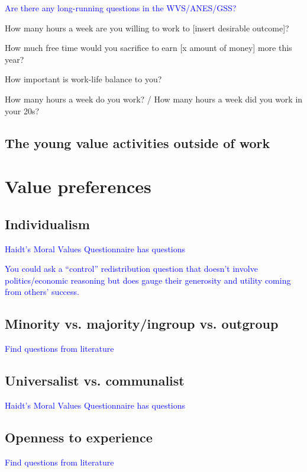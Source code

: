 \documentclass[12pt]{article}
\newcommand{\blue}[1]{\textcolor{blue}{#1}}
\begin{document}
    \blue{Are there any long-running questions in the WVS/ANES/GSS?}

    How many hours a week are you willing to work to [insert desirable outcome]?

    How much free time would you sacrifice to earn [x amount of money] more this year?

    How important is work-life balance to you? 

    How many hours a week do you work? / How many hours a week did you work in your 20s? 

    \subsection{The young value activities outside of work}

\section{Value preferences}
    
    \subsection{Individualism}

        \blue{Haidt's Moral Values Questionnaire has questions}

        \blue{You could ask a ``control'' redistribution question that doesn't involve politics/economic reasoning but does gauge their generosity and utility coming from others' success.}
    
    \subsection{Minority vs. majority/ingroup vs. outgroup}

        \blue{Find questions from literature}
    
    \subsection{Universalist vs. communalist}

        \blue{Haidt's Moral Values Questionnaire has questions}
    
    \subsection{Openness to experience}

        \blue{Find questions from literature}
\end{document}
